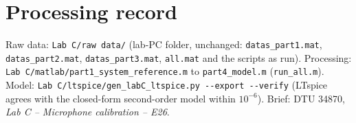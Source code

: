 \documentclass[a4paper,10pt]{article}
\newcommand{\file}[1]{\nolinkurl{#1}}
\begin{document}
\section*{Processing record}
\small
Raw data: \file{Lab C/raw data/} (lab-PC folder, unchanged: \file{datas_part1.mat},
\file{datas_part2.mat}, \file{datas_part3.mat}, \file{all.mat} and the scripts as run).
Processing: \file{Lab C/matlab/part1_system_reference.m} to \file{part4_model.m}
(\file{run_all.m}). Model: \file{Lab C/ltspice/gen_labC_ltspice.py --export --verify}
(LTspice agrees with the closed-form second-order model within $10^{-6}$). Brief: DTU
34870, \emph{Lab C -- Microphone calibration -- E26}.
\end{document}
